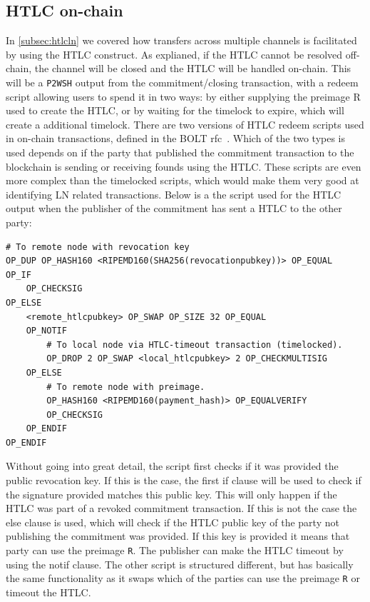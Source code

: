 \subsection{HTLC on-chain}
\label{subsec:htlc_onchain}

In \cref{subsec:htlcln} we covered how transfers across multiple channels is facilitated by using the HTLC construct. As explianed, if the HTLC cannot be resolved off-chain, the channel will be closed and the HTLC will be handled on-chain.
This will be a {\tt P2WSH} output from the commitment/closing transaction, with a redeem script allowing users to spend it in two ways:
by either supplying the preimage R used to create the HTLC, or by waiting for the timelock to expire, which will create a additional timelock. There are two versions of HTLC redeem scripts used in on-chain transactions, defined in the BOLT rfc~\cite{bolt3}. Which of the two types is used depends on if the party that published the commitment transaction to the blockchain is sending or receiving founds using the HTLC. These scripts are even more complex than the timelocked scripts, which would make them very good at identifying LN related transactions. Below is a the script used for the HTLC output when the publisher of the commitment has sent a HTLC to the other party:

\begin{verbatim}
# To remote node with revocation key
OP_DUP OP_HASH160 <RIPEMD160(SHA256(revocationpubkey))> OP_EQUAL
OP_IF
    OP_CHECKSIG
OP_ELSE
    <remote_htlcpubkey> OP_SWAP OP_SIZE 32 OP_EQUAL
    OP_NOTIF
        # To local node via HTLC-timeout transaction (timelocked).
        OP_DROP 2 OP_SWAP <local_htlcpubkey> 2 OP_CHECKMULTISIG
    OP_ELSE
        # To remote node with preimage.
        OP_HASH160 <RIPEMD160(payment_hash)> OP_EQUALVERIFY
        OP_CHECKSIG
    OP_ENDIF
OP_ENDIF
\end{verbatim}

Without going into great detail, the script first checks if it was provided the public revocation key.
If this is the case, the first if clause will be used to check if the signature provided matches this public key. This will only happen if the HTLC was part of a revoked commitment transaction. If this is not the case the else clause is used, which will check if the HTLC public key of the party not publishing the commitment was provided. If this key is provided it means that party can use the preimage {\tt R}. The publisher can make the HTLC timeout by using the notif clause. The other script is structured different, but has basically the same functionality as it swaps which of the parties can use the preimage {\tt R} or timeout the HTLC.
\\

